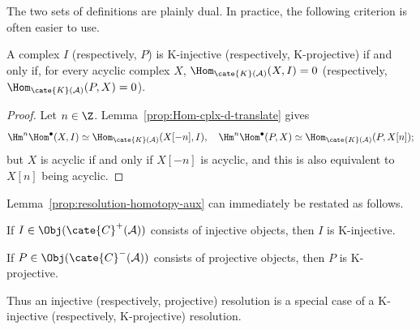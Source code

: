The two sets of definitions are plainly dual. In practice, the following
criterion is often easier to use.

\begin{lemma}\label{prop:K-injective-criterion}
	A complex $I$ (respectively, $P$) is K-injective (respectively,
	K-projective) if and only if, for every acyclic complex $X$,
	$\Hom_{\cate{K}(\mathcal{A})}(X,I)=0$ (respectively,
	$\Hom_{\cate{K}(\mathcal{A})}(P,X)=0$).
\end{lemma}

\begin{proof}
	Let $n\in\Z$. Lemma~\ref{prop:Hom-cplx-d-translate} gives
	\[
	\Hm^n \Hom^\bullet(X, I) \simeq
	\Hom_{\cate{K}(\mathcal{A})}(X[-n], I), \quad
	\Hm^n \Hom^\bullet(P, X) \simeq
	\Hom_{\cate{K}(\mathcal{A})}(P, X[n]);
	\]
	but $X$ is acyclic if and only if $X[-n]$ is acyclic, and this is also
	equivalent to $X[n]$ being acyclic.
\end{proof}

\begin{example}\label{eg:bdd-K-resolution}
	Lemma~\ref{prop:resolution-homotopy-aux} can immediately be restated as
	follows.
	\begin{compactitem}
		\item If $I\in\Obj(\cate{C}^+(\mathcal{A}))$ consists of injective
		objects, then $I$ is K-injective.
		\item If $P\in\Obj(\cate{C}^-(\mathcal{A}))$ consists of projective
		objects, then $P$ is K-projective.
	\end{compactitem}
	Thus an injective (respectively, projective) resolution is a special case
	of a K-injective (respectively, K-projective) resolution.
\end{example}

